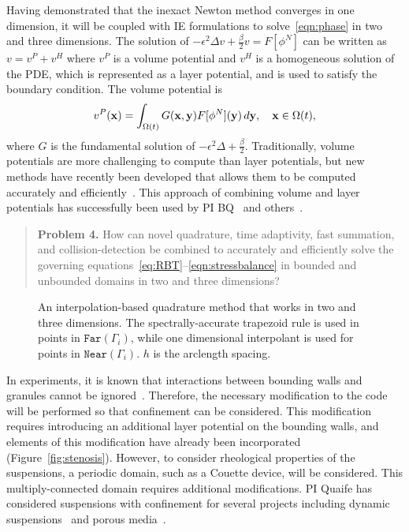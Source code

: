 Having demonstrated that the inexact Newton method converges in one
dimension, it will be coupled with IE formulations to
solve~\eqref{eqn:phase} in two and three dimensions. The solution of
$-\epsilon^2 \Delta v + \tfrac{\beta}{2} v = F[\phi^N]$ can be written
as $v = v^P + v^H$ where $v^P$ is a volume potential and $v^H$ is a
homogeneous solution of the PDE, which is represented as a layer
potential, and is used to satisfy the boundary condition. The volume
potential is
\begin{align*}
  v^{P}(\mathbf{x}) = \int_{\Omega(t)} G(\mathbf{x},\mathbf{y}) F[\phi^N](\mathbf{y})\, d\mathbf{y}, 
    \quad \mathbf{x} \in \Omega(t),
\end{align*}
where $G$ is the fundamental solution of $-\epsilon^2 \Delta +
\tfrac{\beta}{2}$. Traditionally, volume potentials are more challenging
to compute than layer potentials, but new methods have recently been
developed that allows them to be computed accurately and
efficiently~\cite{fry-leh-tor2018, and-zhu-vee2022}. This approach of
combining volume and layer potentials has successfully been used by PI
BQ~\cite{kro-qua2010} and others~\cite{fry-kro-tor2019, kli-ask-kro2020,
che-hua-lei2005}.
\begin{quotation}
  \noindent
  \textbf{Problem 4.} How can novel quadrature, time adaptivity, fast
  summation, and collision-detection be combined to accurately and
  efficiently solve the governing
  equations~\eqref{eq:RBT}--\eqref{eqn:stressbalance} in bounded and
  unbounded domains in two and three dimensions?
\end{quotation}

\begin{wrapfigure}[]{r}{2.1in}
  \centering
  
  \caption{\label{fig:interpquad} An interpolation-based quadrature
  method that works in two and three dimensions. The spectrally-accurate
  trapezoid rule is used in points in $\mathtt{Far}(\Gamma_i)$, while
  one dimensional interpolant is used for points in
  $\mathtt{Near}(\Gamma_i)$. $h$ is the arclength spacing.}
\end{wrapfigure}

In experiments, it is known that interactions between bounding walls and
granules cannot be ignored~\cite{qua-gan-you2021,
KaouiHartingMisbah2011_PRE, her-sto-gra2005}. Therefore, the necessary
modification to the code will be performed so that confinement can be
considered. This modification requires introducing an additional layer
potential on the bounding walls, and elements of this modification have
already been incorporated (Figure~\ref{fig:stenosis}). However, to
consider rheological properties of the suspensions, a periodic domain,
such as a Couette device, will be considered. This multiply-connected
domain requires additional modifications. PI Quaife has considered
suspensions with confinement for several projects including dynamic
suspensions~\cite{qua-bir2014, bys-sha-qua2020} and porous
media~\cite{chi-moo-qua2020, dea-qua-bir-jua2018, moo-che-chi-qua2022,
qua-gan-you2021}. 

